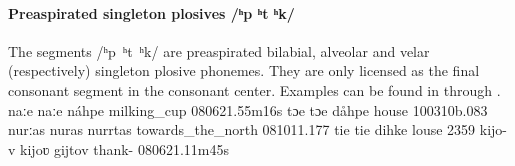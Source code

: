 

\paragraph{Preaspirated singleton plosives /ʰp ʰt ʰk/}
The segments \mbox{/ʰp ʰt ʰk/} are preaspirated bilabial, alveolar and velar (respectively) singleton plosive phonemes. They are only licensed as the final consonant segment in the consonant center. %
Examples can be found in  through .
	{naːe}		{naːe}	{náhpe}	{milking\_cup\BS{}}	{080621}{.55m16s}
		{tɔe}		{tɔe}		{dåhpe}	{house\BS{}}		{100310b}{.083}
		{nurːas}	{nuras}	{nurrtas}	{towards\_the\_north}		{081011}{.177}
		{tie}		{tie}		{dihke}	{louse\BS{}}		{2359}
		{kijo-v}		{kijoʋ}		{gijtov}	{thank-}		{080621}{.11m45s}

